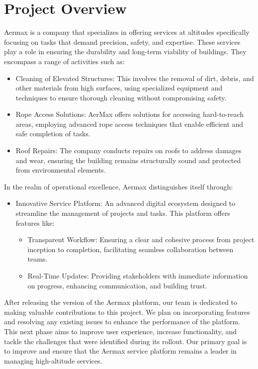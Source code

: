  
\section{Project Overview}
Aermax is a company that specializes in offering services at altitudes specifically focusing on tasks that demand precision, safety, and expertise. These services play a role in ensuring the durability and long-term viability of buildings. They encompass a range of activities such as:
\begin{itemize}
    \item Cleaning of Elevated Structures: This involves the removal of dirt, debris, and other materials from high surfaces, using specialized equipment and techniques to ensure thorough cleaning without compromising safety.
    \item Rope Access Solutions: AerMax offers solutions for accessing hard-to-reach areas, employing advanced rope access techniques that enable efficient and safe completion of tasks.
    \item Roof Repairs: The company conducts repairs on roofs to address damages and wear, ensuring the building remains structurally sound and protected from environmental elements.
  \end{itemize}

  In the realm of operational excellence, Aermax distinguishes itself through:

  \begin{itemize}
    \item Innovative Service Platform: An advanced digital ecosystem designed to streamline the management of projects and tasks. This platform offers features like:
    \begin{itemize}
      \item Transparent Workflow: Ensuring a clear and cohesive process from project inception to completion, facilitating seamless collaboration between teams.
      \item Real-Time Updates: Providing stakeholders with immediate information on progress, enhancing communication, and building trust.
    \end{itemize}
  \end{itemize}
  
  After releasing the version of the Aermax platform, our team is dedicated to making valuable contributions to this project. We plan on incorporating features and resolving any existing issues to enhance the performance of the platform. This next phase aims to improve user experience, increase functionality, and tackle the challenges that were identified during its rollout. Our primary goal is to improve and ensure that the Aermax service platform remains a leader in managing high-altitude services.
    
